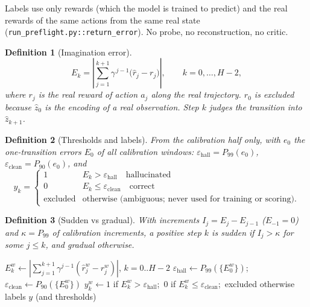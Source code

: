 \documentclass[11pt]{article}
\newtheorem{definition}{Definition}
\newcommand{\abs}[1]{\left|#1\right|}
\newcommand{\code}[1]{\texttt{#1}}
\begin{document}
Labels use only rewards (which the model is trained to predict) and the real rewards of the same actions from the
same real state (\code{run\_preflight.py::return\_error}). No probe, no reconstruction, no critic.

\begin{definition}[Imagination error]
\[
E_k=\abs{\sum_{j=1}^{k+1}\gamma^{\,j-1}\bigl(\hat r_j-r_j\bigr)},\qquad k=0,\dots,H-2,
\]
where $r_j$ is the real reward of action $a_j$ along the real trajectory. $\hat r_0$ is excluded because
$\hat z_0$ is the encoding of a real observation. Step $k$ judges the transition into $\hat z_{k+1}$.
\end{definition}

\begin{definition}[Thresholds and labels]
From the calibration half only, with $e_0$ the one-transition errors $E_0$ of all calibration windows:
$\varepsilon_{\text{hall}}=P_{99}(e_0)$, $\varepsilon_{\text{clean}}=P_{90}(e_0)$, and
\[
y_k=\begin{cases}1&E_k>\varepsilon_{\text{hall}}\quad\text{hallucinated}\\
0&E_k\le\varepsilon_{\text{clean}}\quad\text{correct}\\
\text{excluded}&\text{otherwise (ambiguous; never used for training or scoring).}\end{cases}
\]
\end{definition}

\begin{definition}[Sudden vs gradual]
With increments $I_j=E_j-E_{j-1}$ ($E_{-1}=0$) and $\kappa=P_{99}$ of calibration increments, a positive step $k$ is
\emph{sudden} if $I_j>\kappa$ for some $j\le k$, and \emph{gradual} otherwise.
\end{definition}

\begin{algorithm}[h]
\caption{\textsc{AnswerKey}(rollouts, episodes; thresholds)}\label{alg:labels}
\begin{algorithmic}[1]
 \State $E^w_k\gets\abs{\sum_{j=1}^{k+1}\gamma^{j-1}(\hat r^w_j-r^w_j)}$, $k=0..H-2$ \EndFor
{} \State $\varepsilon_{\text{hall}}\gets P_{99}(\{E^w_0\})$;\ $\varepsilon_{\text{clean}}\gets P_{90}(\{E^w_0\})$ \EndIf
\State $y^w_k\gets 1$ if $E^w_k>\varepsilon_{\text{hall}}$;\ $0$ if $E^w_k\le\varepsilon_{\text{clean}}$;\ excluded otherwise
\State \Return labels $y$ (and thresholds)
\end{algorithmic}
\end{algorithm}
\end{document}
